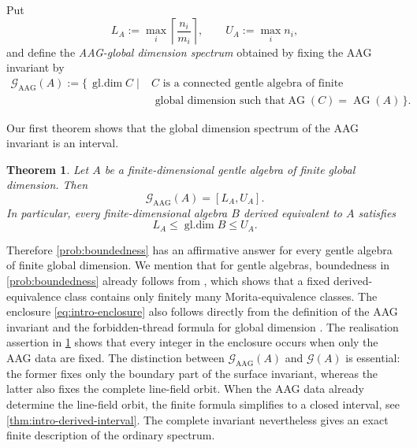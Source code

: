 \documentclass[11pt]{amsart}
\theoremstyle{definition}
\theoremstyle{plain}
\newtheorem{theorem}{Theorem}[section]
\theoremstyle{definition}
\theoremstyle{definition}
\newcommand{\gldim}{\operatorname{gl.dim}}
\newcommand{\AG}{\operatorname{AG}}
\newcommand{\GSpec}{\mathcal G}
\newcommand{\AGSpec}{\mathcal G_{\mathrm{AAG}}}
\begin{document}
Put
\begin{equation}
\label{eq:LU-definition}
 L_A:=\max_i\left\lceil\frac{n_i}{m_i}\right\rceil,
 \qquad U_A:=\max_i n_i,
\end{equation}
and define the \emph{AAG-global dimension spectrum} obtained by fixing the AAG invariant by
\begin{equation}
\label{eq:AAG-fibre-definition}
\begin{aligned}
 \AGSpec(A):=\{\,\gldim C\mid {}&C\text{ is a connected gentle algebra of finite }\\[-2pt]& \text{ global dimension such that} \AG(C)=\AG(A)\,\}.
\end{aligned}
\end{equation}

Our first theorem shows that the global dimension spectrum of the AAG invariant is an interval.

\begin{theorem}
\label{thm:intro-AAG-realization}
Let $A$ be a finite-dimensional gentle algebra of finite global dimension.  Then
\begin{equation}
\label{eq:intro-AAG-realization}
 \AGSpec(A)=[L_A,U_A].
\end{equation}
In particular, every finite-dimensional algebra $B$ derived equivalent to $A$
satisfies
\begin{equation}
\label{eq:intro-enclosure}
 L_A\leq\gldim B\leq U_A.
\end{equation}
\end{theorem}

Therefore \cref{prob:boundedness} has an affirmative answer for every
gentle algebra of finite global dimension. 
We mention that for gentle algebras, boundedness in \cref{prob:boundedness} already follows
from \cite[Corollary~1.2]{SchroerZimmermann}, which shows that a fixed
derived-equivalence class contains only finitely many Morita-equivalence
classes. The enclosure \eqref{eq:intro-enclosure} also follows directly
from the definition of the AAG invariant and the forbidden-thread formula
for global dimension \cite{AvellaAlaminosGeiss}.
The realisation assertion in \cref{thm:intro-AAG-realization} shows that
every integer in the enclosure occurs when only the AAG data are fixed.
The distinction between $\AGSpec(A)$ and $\GSpec(A)$ is essential:
the former fixes only the boundary part of the surface invariant,
whereas the latter also fixes the complete line-field orbit.
When the AAG data already determine the line-field orbit, the finite formula
simplifies to a closed interval, see \cref{thm:intro-derived-interval}.
The complete invariant nevertheless gives an exact finite description of the
ordinary spectrum.
\end{document}

